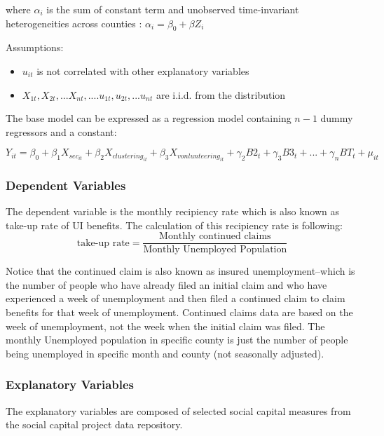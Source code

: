 \documentclass{article}
\begin{document}
where $\alpha_i$ is the sum of constant term and unobserved time-invariant heterogeneities across counties : $\alpha_i=\beta_0+\beta Z_i$

Assumptions:
\begin{itemize}
    \item  $u_{it}$ is not correlated with other explanatory variables
    \item $X_{1t}, X_{2t}, ... X_{nt}, ....u_{1t}, u_{2t}, ...u_{nt}$ are i.i.d. from the distribution
\end{itemize}

The base model can be expressed as a regression model containing $n-1$ dummy regressors and a constant:

$Y_{it}=\beta_0+\beta_1 X_{sec_{it}}+\beta_2 X_{clustering_{it}}+\beta_3 X_{vonlunteering_{it}}+\gamma_2 B2_t+\gamma_3 B3_t +...+\gamma_n BT_t+\mu_{it}$

\subsubsection{Dependent Variables}


The dependent variable is the monthly recipiency rate which is also known as take-up rate of UI benefits. The calculation of this recipiency rate is following: $$\text{take-up rate}=\frac{\text{Monthly continued claims}}{\text{Monthly Unemployed Population}}$$

Notice that the continued claim is also known as insured unemployment--which is the number of people who have already filed an initial claim and who have experienced a week of unemployment and then filed a continued claim to claim benefits for that week of unemployment. Continued claims data are based on the week of unemployment, not the week when the initial claim was filed. The monthly Unemployed population in specific county is just the number of people being unemployed in specific month and county (not seasonally adjusted).

\subsubsection{Explanatory Variables}

The explanatory variables are composed of selected social capital measures from the social capital project data repository.
\end{document}
